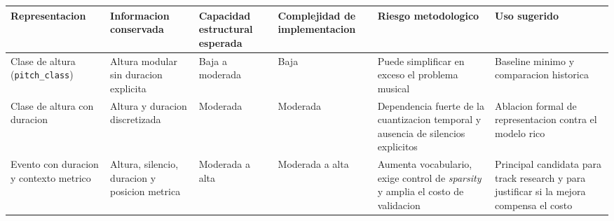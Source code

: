 \begin{tabular}{p{3.0cm}p{3.0cm}p{2.7cm}p{2.8cm}p{2.9cm}p{2.8cm}}
\hline
Representacion & Informacion conservada & Capacidad estructural esperada & Complejidad de implementacion & Riesgo metodologico & Uso sugerido \\
\hline
Clase de altura (\texttt{pitch\_class}) & Altura modular sin duracion explicita & Baja a moderada & Baja & Puede simplificar en exceso el problema musical & Baseline minimo y comparacion historica \\
Clase de altura con duracion & Altura y duracion discretizada & Moderada & Moderada & Dependencia fuerte de la cuantizacion temporal y ausencia de silencios explicitos & Ablacion formal de representacion contra el modelo rico \\
Evento con duracion y contexto metrico & Altura, silencio, duracion y posicion metrica & Moderada a alta & Moderada a alta & Aumenta vocabulario, exige control de \emph{sparsity} y amplia el costo de validacion & Principal candidata para track research y para justificar si la mejora compensa el costo \\
\hline
\end{tabular}
